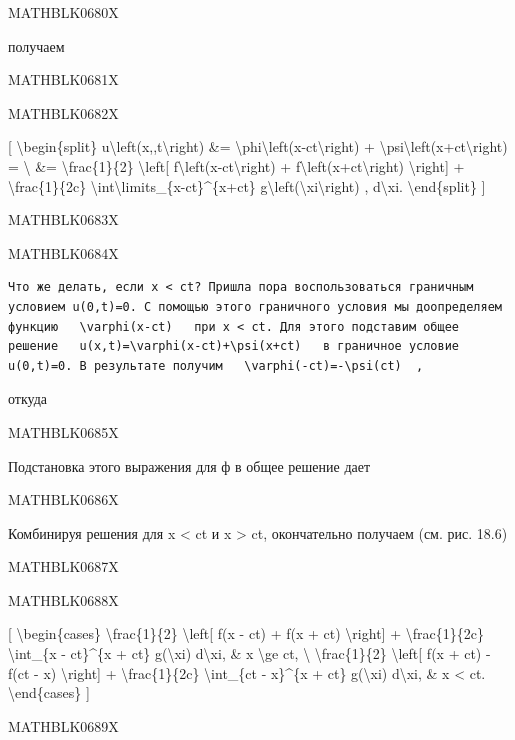 \documentclass[
]{article}
\begin{document}
MATHBLK0680X

получаем

MATHBLK0681X

MATHBLK0682X

{[} \textbackslash begin\{split\}
u\textbackslash left(x,,t\textbackslash right) \&=
\textbackslash phi\textbackslash left(x-ct\textbackslash right) +
\textbackslash psi\textbackslash left(x+ct\textbackslash right) =
\textbackslash{} \&= \textbackslash frac\{1\}\{2\}
\textbackslash left{[} f\textbackslash left(x-ct\textbackslash right) +
f\textbackslash left(x+ct\textbackslash right) \textbackslash right{]} +
\textbackslash frac\{1\}\{2c\}
\textbackslash int\textbackslash limits\_\{x-ct\}\^{}\{x+ct\}
g\textbackslash left(\textbackslash xi\textbackslash right) ,
d\textbackslash xi. \textbackslash end\{split\} {]}

MATHBLK0683X

MATHBLK0684X

\begin{verbatim}
Что же делать, если x < ct? Пришла пора воспользоваться граничным условием u(0,t)=0. С помощью этого граничного условия мы доопределяем функцию   \varphi(x-ct)   при x < ct. Для этого подставим общее решение   u(x,t)=\varphi(x-ct)+\psi(x+ct)   в граничное условие u(0,t)=0. В результате получим   \varphi(-ct)=-\psi(ct)  ,
\end{verbatim}

откуда

MATHBLK0685X

Подстановка этого выражения для ф в общее решение дает

MATHBLK0686X

Комбинируя решения для x \textless{} ct и x \textgreater{} ct,
окончательно получаем (см. рис. 18.6)

MATHBLK0687X

MATHBLK0688X

{[} \textbackslash begin\{cases\} \textbackslash frac\{1\}\{2\}
\textbackslash left{[} f(x - ct) + f(x + ct) \textbackslash right{]} +
\textbackslash frac\{1\}\{2c\} \textbackslash int\_\{x - ct\}\^{}\{x +
ct\} g(\textbackslash xi) d\textbackslash xi, \& x \textbackslash ge ct,
\textbackslash{} \textbackslash frac\{1\}\{2\} \textbackslash left{[}
f(x + ct) - f(ct - x) \textbackslash right{]} +
\textbackslash frac\{1\}\{2c\} \textbackslash int\_\{ct - x\}\^{}\{x +
ct\} g(\textbackslash xi) d\textbackslash xi, \& x \textless{} ct.
\textbackslash end\{cases\} {]}

MATHBLK0689X
\end{document}
